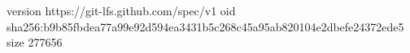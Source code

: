 version https://git-lfs.github.com/spec/v1
oid sha256:b9b85fbdea77a99e92d594ea3431b5c268c45a95ab820104e2dbefe24372ede5
size 277656
